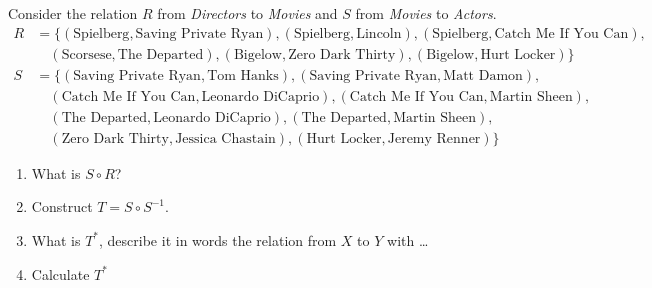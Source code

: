 \begin{questions}
Consider the relation $R$ from \textit{Directors} to \textit{Movies} and $S$ from \textit{Movies} to \textit{Actors}.
\begin{align*}
R &= \{ (\text{Spielberg}, \text{Saving Private Ryan}), 
		(\text{Spielberg}, \text{Lincoln}), 
		(\text{Spielberg}, \text{Catch Me If You Can}), \\
  		& \quad  (\text{Scorsese}, \text{The Departed}), 
  		(\text{Bigelow}, \text{Zero Dark Thirty}), 
  		(\text{Bigelow}, \text{Hurt Locker}) \} \\
S &= \{ (\text{Saving Private Ryan}, \text{Tom Hanks}), 
		(\text{Saving Private Ryan}, \text{Matt Damon}),  \\
  		& \quad  (\text{Catch Me If You Can}, \text{Leonardo DiCaprio}), 
  		(\text{Catch Me If You Can}, \text{Martin Sheen}),  \\
  		& \quad (\text{The Departed}, \text{Leonardo DiCaprio}), 
  		(\text{The Departed}, \text{Martin Sheen}),  \\
  		& \quad (\text{Zero Dark Thirty}, \text{Jessica Chastain}), 
  		(\text{Hurt Locker}, \text{Jeremy Renner})  \}
\end{align*}
	\ifprintanswers
	\else
	\begin{enumerate}[label=(\alph*)]
		\item What is $S \circ R$?
		\item Construct $T = S \circ S^{-1}$.
		\item What is $T^*$, describe it in words the relation from $X$ to $Y$ with \ldots
		\item Calculate $T^*$
	\end{enumerate}
	\fi


\end{questions}

